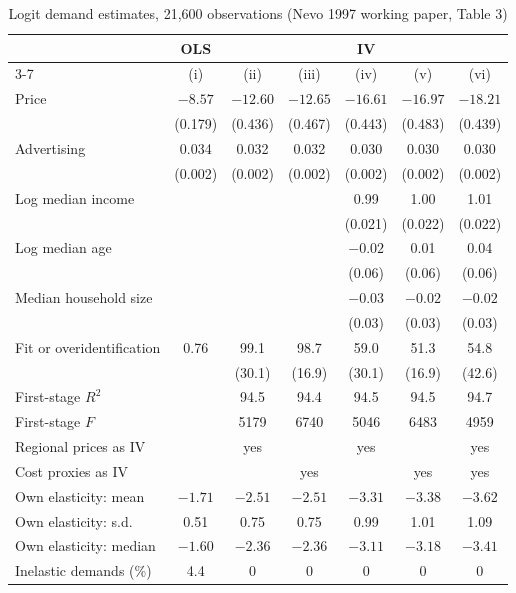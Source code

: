 \begin{table}[htbp]
\centering
\caption{Logit demand estimates, 21,600 observations (Nevo 1997 working paper, Table 3)}
\label{tab:11-nevo-logit}
\small
\setlength{\tabcolsep}{4.5pt}
\begin{tabular}{@{}lcccccc@{}}
\toprule
 & OLS & \multicolumn{5}{c}{IV} \\
\cmidrule(lr){3-7}
 & (i) & (ii) & (iii) & (iv) & (v) & (vi) \\
\midrule
Price                  & $-8.57$ & $-12.60$ & $-12.65$ & $-16.61$ & $-16.97$ & $-18.21$ \\
                       & (0.179) & (0.436)  & (0.467)  & (0.443)  & (0.483)  & (0.439)  \\
Advertising            & 0.034   & 0.032    & 0.032    & 0.030    & 0.030    & 0.030    \\
                       & (0.002) & (0.002)  & (0.002)  & (0.002)  & (0.002)  & (0.002)  \\
Log median income      &         &          &          & 0.99     & 1.00     & 1.01     \\
                       &         &          &          & (0.021)  & (0.022)  & (0.022)  \\
Log median age         &         &          &          & $-0.02$  & 0.01     & 0.04     \\
                       &         &          &          & (0.06)   & (0.06)   & (0.06)   \\
Median household size  &         &          &          & $-0.03$  & $-0.02$  & $-0.02$  \\
                       &         &          &          & (0.03)   & (0.03)   & (0.03)   \\
\midrule
Fit or overidentification & 0.76 & 99.1     & 98.7     & 59.0     & 51.3     & 54.8     \\
                       &         & (30.1)   & (16.9)   & (30.1)   & (16.9)   & (42.6)   \\
First-stage $R^2$      &         & 94.5     & 94.4     & 94.5     & 94.5     & 94.7     \\
First-stage $F$        &         & 5179     & 6740     & 5046     & 6483     & 4959     \\
Regional prices as IV  &         & yes      &          & yes      &          & yes      \\
Cost proxies as IV     &         &          & yes      &          & yes      & yes      \\
\midrule
Own elasticity: mean   & $-1.71$ & $-2.51$  & $-2.51$  & $-3.31$  & $-3.38$  & $-3.62$  \\
Own elasticity: s.d.   & 0.51    & 0.75     & 0.75     & 0.99     & 1.01     & 1.09     \\
Own elasticity: median & $-1.60$ & $-2.36$  & $-2.36$  & $-3.11$  & $-3.18$  & $-3.41$  \\
Inelastic demands (\%) & 4.4     & 0        & 0        & 0        & 0        & 0        \\
\bottomrule
\end{tabular}


\end{table}
